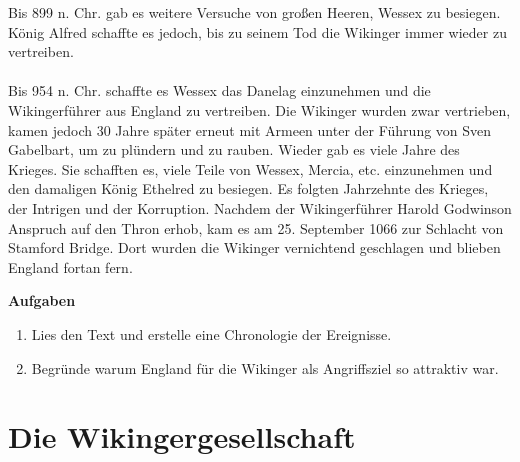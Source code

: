 \documentclass[12pt,a4paper,ngerman,openany]{book}
\newcommand{\aufgaben}[1]{
  \begin{tcolorbox}
    \textbf{Aufgaben}
    \begin{enumerate}
      #1
    \end{enumerate}
  \end{tcolorbox}
} %
\newcommand{\fchapter}[1]{\chapter{#1}\thispagestyle{chapterstyle}}
\begin{document}
Bis 899 n. Chr. gab es weitere Versuche von großen Heeren, Wessex zu besiegen. König Alfred schaffte es jedoch, bis zu seinem Tod die Wikinger immer wieder zu vertreiben.\\\\
Bis 954 n. Chr. schaffte es Wessex das Danelag einzunehmen und die Wikingerführer aus England zu vertreiben. Die Wikinger wurden zwar vertrieben, kamen jedoch 30 Jahre später erneut mit Armeen unter der Führung von Sven Gabelbart, um zu plündern und zu rauben. Wieder gab es viele Jahre des Krieges. Sie schafften es, viele Teile von Wessex, Mercia, etc. einzunehmen und den damaligen König Ethelred zu besiegen. Es folgten Jahrzehnte des Krieges, der Intrigen und der Korruption. Nachdem der Wikingerführer Harold Godwinson Anspruch auf den Thron erhob, kam es am 25. September 1066 zur Schlacht von Stamford Bridge. Dort wurden die Wikinger vernichtend geschlagen und blieben England fortan fern.

\aufgaben{
  \item Lies den Text und erstelle eine Chronologie der Ereignisse.
  \item Begründe warum England für die Wikinger als Angriffsziel so attraktiv war.
}

\fchapter{Die Wikingergesellschaft}

\end{document}
